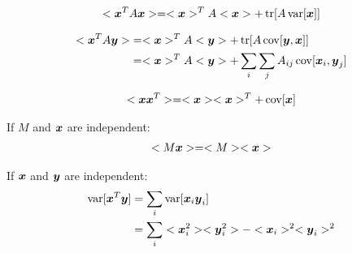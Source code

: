 \documentclass[a4paper]{article}
\begin{document}
\begin{align}
  \label{eq:xAx}
  <\bs{x}^T A \bs{x}>=<\bs{x}>^T A <\bs{x}> + \Xtr[A \Xvar[\bs{x}]]
\end{align}

\begin{align}
  \label{eq:xAy}
  <\bs{x}^T A \bs{y}>
  &=<\bs{x}>^T A <\bs{y}> + \Xtr[A \Xcov[\bs{y},\bs{x}]] \\
  &=<\bs{x}>^T A <\bs{y}> + \sum_i\sum_j A_{ij} \Xcov[\bs{x}_i,\bs{y}_j]
\end{align}

\begin{align}
  \label{eq:xx}
  <\bs{x}\bs{x}^T>=<\bs{x}><\bs{x}>^T+ \Xcov[\bs{x}]
\end{align}

If $M$ and $\boldsymbol{x}$ are independent:
\begin{align}
  \label{eq:Mx}
  <M \Xvx>=<M><\Xvx>
\end{align}

If $\boldsymbol{x}$ and $\boldsymbol{y}$ are independent:
\begin{align}
  \label{eq:vxy}
  \Xvar[\Xvx^T\Xvy]
  &=\sum_i \Xvar[\Xvx_i \Xvy_i] \\
  &=\sum_i <\Xvx_i^2><\Xvy_i^2> - <\Xvx_i>^2<\Xvy_i>^2 
\end{align}
\end{document}
